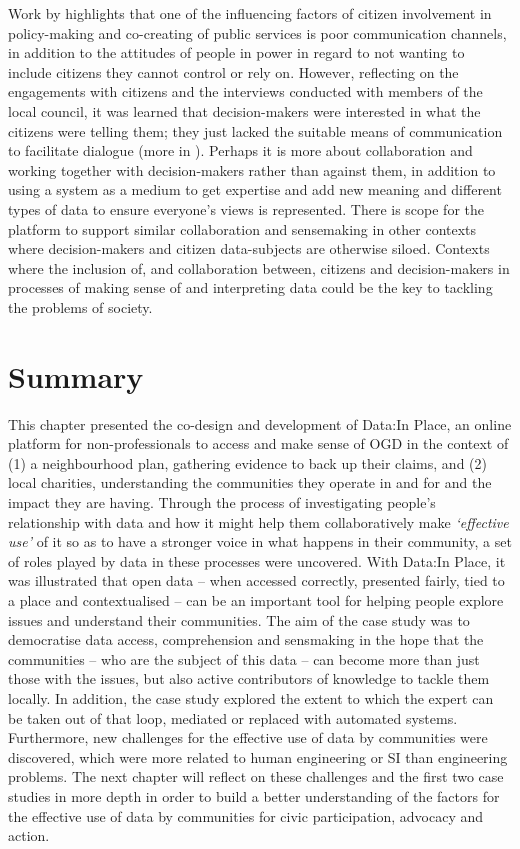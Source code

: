 Work by \citet{voorberg_systematic_2015} highlights that one of the influencing factors of citizen involvement in policy-making and co-creating of public services is poor communication channels, in addition to the attitudes of people in power in regard to not wanting to include citizens they cannot control or rely on. However, reflecting on the engagements with citizens and the interviews conducted with members of the local council, it was learned that decision-makers were interested in what the citizens were telling them; they just lacked the suitable means of communication to facilitate dialogue (more in \citet{johnson_neighbourhood_2018}). Perhaps it is more about collaboration and working together with decision-makers rather than against them, in addition to using a system as a medium to get expertise and add new meaning and different types of data to ensure everyone's views is represented. There is scope for the platform to support similar collaboration and sensemaking in other contexts where decision-makers and citizen data-subjects are otherwise siloed. Contexts where the inclusion of, and collaboration between, citizens and decision-makers in processes of making sense of and interpreting data could be the key to tackling the problems of society.
\clearpage

\section{Summary}
This chapter presented the co-design and development of Data:In Place, an online platform for non-professionals to access and make sense of OGD in the context of (1) a neighbourhood plan, gathering evidence to back up their claims, and (2) local charities, understanding the communities they operate in and for and the impact they are having. Through the process of investigating people's relationship with data and how it might help them collaboratively make \textit{`effective use'} of it so as to have a stronger voice in what happens in their community, a set of roles played by data in these processes were uncovered. With Data:In Place, it was illustrated that open data -- when accessed correctly, presented fairly, tied to a place and contextualised -- can be an important tool for helping people explore issues and understand their communities. The aim of the case study was to democratise data access, comprehension and sensmaking in the hope that the communities -- who are the subject of this data -- can become more than just those with the issues, but also active contributors of knowledge to tackle them locally. In addition, the case study explored the extent to which the expert can be taken out of that loop, mediated or replaced with automated systems. Furthermore, new challenges for the effective use of data by communities were discovered, which were more related to human engineering or SI than engineering problems. The next chapter will reflect on these challenges and the first two case studies in more depth in order to build a better understanding of the factors for the effective use of data by communities for civic participation, advocacy and action.